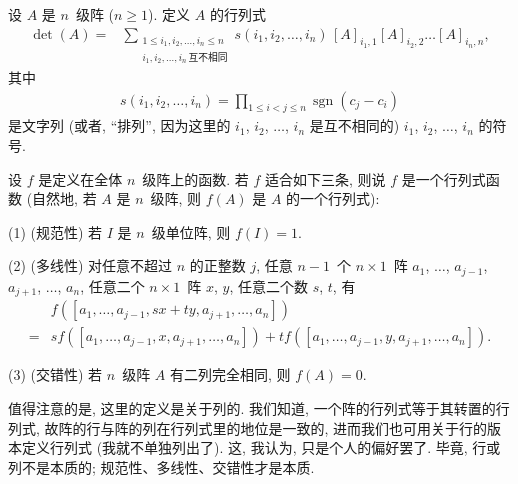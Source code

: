 \documentclass[%
    UTF8,%
    fontset=none,%
    punct=kaiming,%
    zihao=-4,%
    a4paper,%
    oneside,%
]{ctexbook}
\renewcommand*{\leq}{\leqslant}
\renewcommand*{\geq}{\geqslant}
\begin{document}
\begin{definition}
    设 \(A\) 是 \(n\)~级阵 (\(n \geq 1\)).
    定义 \(A\) 的行列式
    \begin{align*}
        \det {(A)}
        = {} &
        \sum_{\substack{
        1 \leq i_1, i_2, \dots, i_n \leq n \\
                i_1, i_2, \dots, i_n\,\text{互不相同}
            }}
        {s(i_1, i_2, \dots, i_n)\,
            [A]_{i_1,1} [A]_{i_2,2} \dots [A]_{i_n,n}},
    \end{align*}
    其中
    \begin{align*}
        s(i_1, i_2, \dots, i_n)
        = \prod_{1 \leq i < j \leq n}
        {\operatorname{sgn} {(c_j - c_i)}}
    \end{align*}
    是文字列
    (或者, ``排列'',
    因为这里的 \(i_1\), \(i_2\), \(\dots\), \(i_n\)
    是互不相同的)
    \(i_1\), \(i_2\), \(\dots\), \(i_n\) 的符号.
\end{definition}

\begin{definition}
    设 \(f\) 是定义在全体 \(n\)~级阵上的函数.
    若 \(f\) 适合如下三条, 则说
    \(f\) 是一个行列式函数
    (自然地, 若 \(A\) 是 \(n\)~级阵,
    则 \(f(A)\) 是 \(A\) 的一个行列式):

    (1)
    (规范性)
    若 \(I\) 是 \(n\)~级单位阵,
    则 \(f(I) = 1\).

    (2)
    (多线性)
    对任意不超过 \(n\) 的正整数 \(j\),
    任意 \(n-1\)~个 \(n \times 1\)~阵
    \(a_1\), \(\dots\), \(a_{j-1}\),
    \(a_{j+1}\), \(\dots\), \(a_n\),
    任意二个 \(n \times 1\)~阵 \(x\), \(y\),
    任意二个数 \(s\), \(t\),
    有
    \begin{align*}
             & f
            {([a_1, \dots, a_{j-1}, sx + ty,
                        a_{j+1}, \dots, a_n])}
        \\
        = {} &
        s
        f {([a_1, \dots, a_{j-1}, x, a_{j+1}, \dots, a_n])}
        +
        t
        f {([a_1, \dots, a_{j-1}, y, a_{j+1}, \dots, a_n])}.
    \end{align*}

    (3)
    (交错性)
    若 \(n\)~级阵 \(A\) 有二列完全相同,
    则 \(f {(A)} = 0\).
\end{definition}

值得注意的是, 这里的定义是关于列的.
我们知道, 一个阵的行列式等于其转置的行列式,
故阵的行与阵的列在行列式里的地位是一致的,
进而我们也可用关于行的版本定义行列式
(我就不单独列出了).
这, 我认为, 只是个人的偏好罢了.
毕竟, 行或列不是本质的;
规范性、多线性、交错性才是本质.
\end{document}
